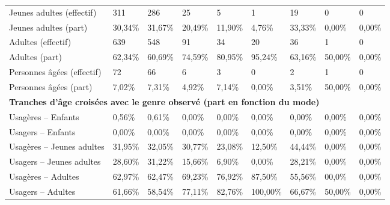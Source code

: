 \begin{longtable}{p{3.7cm}p{0.9cm}p{0.9cm}p{0.9cm}p{0.9cm}p{0.9cm}p{0.9cm}p{0.9cm}p{0.9cm}}
    \small{Jeunes adultes (effectif)} & \small{311} & \small{286} & \small{25} & \small{5} & \small{1} & \small{19} & \small{0} & \small{0}\\    
    \small{Jeunes adultes (part)} & \small{30,34\%} & \small{31,67\%} & \small{20,49\%} & \small{11,90\%} & \small{4,76\%} & \small{33,33\%} & \small{0,00\%} & \small{0,00\%}\\    
    \small{Adultes (effectif)} & \small{639} & \small{548} & \small{91} & \small{34} & \small{20} & \small{36} & \small{1} & \small{0}\\    
    \small{Adultes (part)} & \small{62,34\%} & \small{60,69\%} & \small{74,59\%} & \small{80,95\%} & \small{95,24\%} & \small{63,16\%} & \small{50,00\%} & \small{0,00\%}\\    
    \small{Personnes âgées (effectif)} & \small{72} & \small{66} & \small{6} & \small{3} & \small{0} & \small{2} & \small{1} & \small{0}\\    
    \small{Personnes âgées (part)} & \small{7,02\%} & \small{7,31\%} & \small{4,92\%} & \small{7,14\%} & \small{0,00\%} & \small{3,51\%} & \small{50,00\%} & \small{0,00\%}\\
    \hline
\multicolumn{9}{l}{\textbf{Tranches d'âge croisées avec le genre observé (part en fonction du mode)}}\\
    \small{Usagères – Enfants} & \small{0,56\%} & \small{0,61\%} & \small{0,00\%} & \small{0,00\%} & \small{0,00\%} & \small{0,00\%} & \small{0,00\%} & \small{0,00\%}\\    
    \small{Usagers – Enfants} & \small{0,00\%} & \small{0,00\%} & \small{0,00\%} & \small{0,00\%} & \small{0,00\%} & \small{0,00\%} & \small{0,00\%} & \small{0,00\%}\\    
    \small{Usagères – Jeunes adultes} & \small{31,95\%} & \small{32,05\%} & \small{30,77\%} & \small{23,08\%} & \small{12,50\%} & \small{44,44\%} & \small{0,00\%} & \small{0,00\%}\\    
    \small{Usagers – Jeunes adultes} & \small{28,60\%} & \small{31,22\%} & \small{15,66\%} & \small{6,90\%} & \small{0,00\%} & \small{28,21\%} & \small{0,00\%} & \small{0,00\%}\\    
    \small{Usagères – Adultes} & \small{62,97\%} & \small{62,47\%} & \small{69,23\%} & \small{76,92\%} & \small{87,50\%} & \small{55,56\%} & \small{00,0\%} & \small{0,00\%}\\   
    \small{Usagers – Adultes} & \small{61,66\%} & \small{58,54\%} & \small{77,11\%} & \small{82,76\%} & \small{100,00\%} & \small{66,67\%} & \small{50,00\%} & \small{0,00\%}\\    

\end{longtable}
